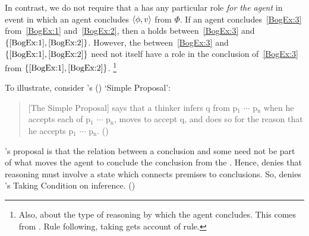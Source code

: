 \begin{note}
  In contrast, we do not require that a \ros{} has any particular role \emph{for the agent} in event in which an agent concludes \(\langle \phi, v \rangle\) from \(\Phi\).
  If an agent concludes~\ref{BogEx:3} from~\ref{BogEx:1} and~\ref{BogEx:2}, then a \ros{} holds between~\ref{BogEx:3} and \(\{\ref{BogEx:1}, \ref{BogEx:2}\}\).
  However, the \ros{} between~\ref{BogEx:3} and \(\{\ref{BogEx:1}, \ref{BogEx:2}\}\) need not itself have a role in the \agents{} conclusion of~\ref{BogEx:3} from \(\{\ref{BogEx:1}, \ref{BogEx:2}\}\).%
  \footnote{
    Also, about the type of reasoning by which the agent concludes.
    This comes from \textcite{Boghossian:2008vf,Boghossian:2012vb}.
    Rule following, taking gets account of rule.
  }

  To illustrate, consider \citeauthor{Wright:2014tt}'s (\citeyear{Wright:2014tt}) `Simple Proposal':
  \begin{quote}
    [The Simple Proposal] says that a thinker infers q from p\(_{1}\) \(\cdots\) p\(_{\text{n}}\) when he accepts each of p\(_{1}\) \(\cdots\) p\(_{\text{n}}\), moves to accept q, and does so for the reason that he accepts p\(_{1}\) \(\cdots\) p\(_{\text{n}}\).%
    \mbox{}\hfill\mbox{(\citeyear[33]{Wright:2014tt})}
  \end{quote}
  \citeauthor{Wright:2014tt}'s proposal is that the relation between a conclusion and some \pool{} need not be part of what moves the agent to conclude the conclusion from the \pool{}.
  Hence, \citeauthor{Wright:2014tt} denies that reasoning must involve a state which connects premises to conclusions.
  So, \citeauthor{Wright:2014tt} denies \citeauthor{Boghossian:2008vf}'s Taking Condition on inference.
  (\citeyear[Cf.][33-34]{Wright:2014tt})


\end{note}
